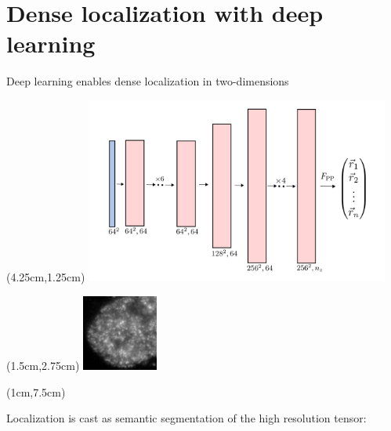 \documentclass{beamer}					%
\begin{document}
\section{Dense localization with deep learning}
\begin{frame}{Deep learning enables dense localization in two-dimensions}
\begin{textblock*}{10cm}(4.25cm,1.25cm)
\includegraphics[width=10cm]{DeepSTORM.png}
\end{textblock*}
\begin{textblock*}{2.5cm}(1.5cm,2.75cm)
\includegraphics[width=2.5cm]{Laser-Crop.png}
\end{textblock*}

\begin{textblock*}{\textwidth}(1cm,7.5cm)

Localization is cast as semantic segmentation of the high resolution tensor:

\end{textblock*}

\end{frame}
\end{document}
